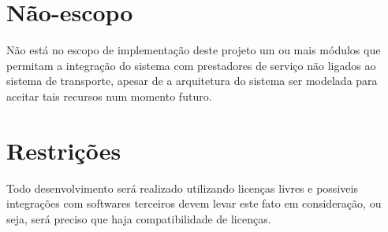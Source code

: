 \section{Não-escopo}\label{sec:NãoEscopo}
	Não está no escopo de implementação deste projeto um ou mais módulos que permitam a integração do sistema com prestadores de serviço não ligados ao sistema de transporte, apesar de a arquitetura do sistema ser modelada para aceitar tais recursos num momento futuro.

%
%        
%         
%			
%
%
%			
%


\section{Restrições}\label{sec:restrições}
Todo desenvolvimento será realizado utilizando licenças livres e possiveis integrações com softwares terceiros devem levar este fato em consideração, ou seja, será preciso que haja compatibilidade de licenças.

